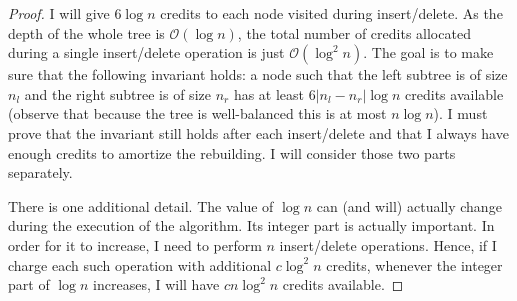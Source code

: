 \documentclass[10pt,a4paper]{article}
\newcommand{\Oh}{\mathcal{O}}
\begin{document}
\begin{proof}

I will give $6\log n$ credits to each node visited during insert/delete. As the depth of the whole tree is $\Oh(\log n)$, the total number of credits allocated during a single insert/delete operation is just $\Oh(\log^{2}n)$. The goal is to make sure that the following invariant holds: a node such that the left subtree is of size $n_{l}$ and the right subtree is of size $n_{r}$ has at least $6|n_{l}-n_{r}|\log n$ credits available (observe that because the tree is well-balanced this is at most $n\log n$). I must prove that the invariant still holds after each insert/delete and that I always have enough credits to amortize the rebuilding. I will consider those two parts separately.


There is one additional detail. The value of $\log n$ can (and will) actually change during the execution of the algorithm. Its integer part is actually important. In order for it to increase, I need to perform $n$ insert/delete operations. Hence, if I charge each such operation with additional $c\log^{2} n$ credits, whenever the integer part of $\log n$ increases, I will have $cn\log^{2} n$ credits available. 


\end{proof}
\end{document}
